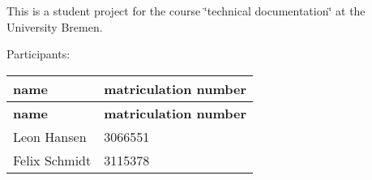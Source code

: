 This is a student project for the course \char`\"{}technical documentation\char`\"{} at the University Bremen.

Participants\+: \tabulinesep=1mm
\begin{longtabu} spread 0pt [c]{*{2}{|X[-1]}|}
\hline
\rowcolor{\tableheadbgcolor}\textbf{ name }&\textbf{ matriculation number  }\\
\endfirsthead
\hline
\endfoot
\hline
\rowcolor{\tableheadbgcolor}\textbf{ name }&\textbf{ matriculation number  }\\
\endhead
Leon Hansen &3066551 \\
Felix Schmidt &3115378 \\
\end{longtabu}
